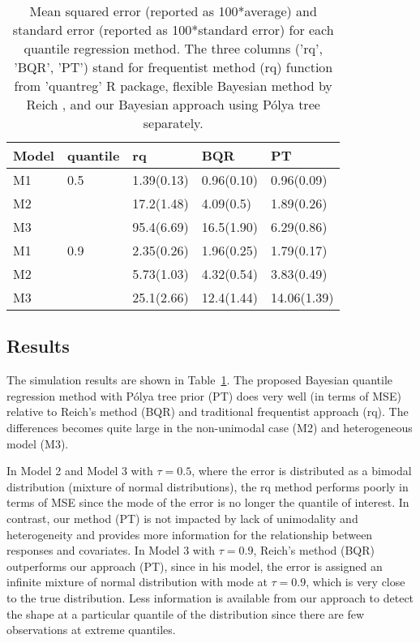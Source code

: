 \documentclass[12pt]{article}
\newcommand{\polya}{P\'{o}lya}
\begin{document}
\begin{center}
  \begin{table}[h]
    \centering
    \caption[]{ Mean squared error (reported as 100*average) and standard
      error (reported as 100*standard error) for each
      quantile regression method.   The three
      columns ('rq', 'BQR',
      'PT') stand for frequentist method (rq) function from
      'quantreg' R package, flexible Bayesian method by Reich , and
      our Bayesian approach using \polya{} tree separately.}
    \vspace{4mm}
    \begin{tabular}[tb]{l|l|lll}
      \hline
      Model & quantile & rq         & BQR        & PT          \\
      \hline
      M1    & 0.5      & 1.39(0.13) & 0.96(0.10) & 0.96(0.09)  \\
      M2    &          & 17.2(1.48) & 4.09(0.5)  & 1.89(0.26)  \\
      M3    &          & 95.4(6.69) & 16.5(1.90) & 6.29(0.86)  \\
      \hline
      M1    & 0.9      & 2.35(0.26) & 1.96(0.25) & 1.79(0.17)  \\
      M2    &          & 5.73(1.03) & 4.32(0.54) & 3.83(0.49)  \\
      M3    &          & 25.1(2.66) & 12.4(1.44) & 14.06(1.39) \\
      \hline
    \end{tabular}
    \label{tab:1}
  \end{table}
\end{center}

\subsection{Results}
The simulation results are shown in Table~\ref{tab:1}. The proposed
Bayesian quantile regression method with \polya{} tree prior (PT) does
very well (in terms of MSE) relative to Reich's method (BQR) and
traditional frequentist approach (rq).  The differences becomes quite
large in the non-unimodal case (M2) and heterogeneous model (M3).

In Model 2 and Model 3 with $\tau=0.5$, where the error is distributed
as a bimodal distribution (mixture of normal distributions), the rq
method performs poorly in terms of MSE since the mode of the error is
no longer the quantile of interest. In contrast, our method (PT) is
not impacted by lack of unimodality and heterogeneity and provides
more information for the relationship between responses and
covariates. In Model 3 with $\tau=0.9$, Reich's method (BQR)
outperforms our approach (PT), since in his model, the error is
assigned an infinite mixture of normal distribution with mode at
$\tau=0.9$, which is very close to the true distribution. Less
information is available from our approach to detect the shape at a
particular quantile of the distribution since there are few
observations at extreme quantiles.
\end{document}
